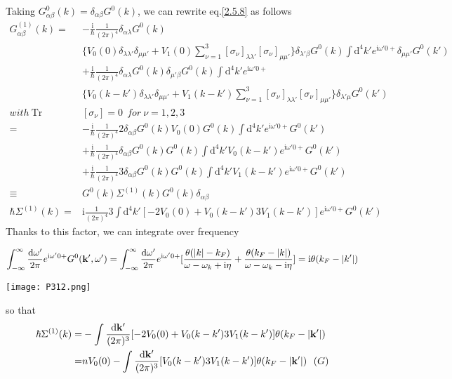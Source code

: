 Taking $G_{\alpha\beta}^0(k)=\delta_{\alpha\beta}G^0(k)$, we can rewrite eq.\eqref{2.5.8} as follows  
\begin{align}
G_{\alpha\beta}^{(1)}(k)=&-\frac{\mathrm{i}}{\hbar}\frac{1}{(2\pi)^4}\delta_{\alpha\lambda}G^{0}(k)
\nonumber \\
&\{V_0(0) \delta_{\lambda\lambda'}\delta_{\mu\mu'}+V_1(0)\sum_{\nu=1}^{3}[\sigma_{\nu}]_{\lambda\lambda'}[\sigma_{\nu}]_{\mu\mu'}\}\delta_{\lambda'\beta}G^0(k)\int \mathrm{d}^4k'e^{\mathrm{i}\omega'0+}\delta_{\mu\mu'}G^0(k')\nonumber \\
&+\frac{\mathrm{i}}{\hbar}\frac{1}{(2\pi)^4}\delta_{\alpha\lambda}G^0(k)\delta_{\mu'\beta}G^0(k)\int \mathrm{d}^4k'e^{\mathrm{i}\omega'0+}\nonumber\\
&\{V_0(k-k') \delta_{\lambda\lambda'}\delta_{\mu\mu'}+V_1(k-k')\sum_{\nu=1}^{3}[\sigma_{\nu}]_{\lambda\lambda'}[\sigma_{\nu}]_{\mu\mu'}\}\delta_{\lambda'\mu}G^0(k') \nonumber \\
with\ \mathrm{Tr}&[\sigma_{\nu}]=0\ \ for \ \nu=1,2,3 \nonumber \\
=&-\frac{\mathrm{i}}{\hbar}\frac{1}{(2\pi)^4}2\delta_{\alpha\beta}G^{0}(k)V_0(0)G^0(k)\int \mathrm{d}^4k'e^{\mathrm{i}\omega'0+}G^0(k')\nonumber \\
&+\frac{\mathrm{i}}{\hbar}\frac{1}{(2\pi)^4}\delta_{\alpha\beta}G^{0}(k)G^0(k)\int \mathrm{d}^4k'V_0(k-k')e^{\mathrm{i}\omega'0+}G^0(k')\nonumber \\
&+\frac{\mathrm{i}}{\hbar}\frac{1}{(2\pi)^4}3\delta_{\alpha\beta}G^{0}(k)G^0(k)\int \mathrm{d}^4k'V_1(k-k')e^{\mathrm{i}\omega'0+}G^0(k')\nonumber \\
\equiv& G^{0}(k)\Sigma^{(1)}(k)G^0(k)\delta_{\alpha\beta} \nonumber \\
\hbar \Sigma^{(1)}(k)=& \mathrm{i}\frac{1}{(2\pi)^4}3\int \mathrm{d}^4k'[-2V_0(0)+V_0(k-k')3V_1(k-k')]e^{\mathrm{i}\omega'0+}G^0(k') \nonumber
\end{align}
Thanks to this factor, we can integrate over frequency

\begin{align}
\int_{-\infty}^{\infty}\frac{\mathrm{d}\omega'}{2\pi}e^{\mathrm{i}\omega'0+}G^0({\bf k}',\omega')=\int_{-\infty}^{\infty}\frac{\mathrm{d}\omega'}{2\pi}e^{\mathrm{i}\omega'0+}[\frac{\theta(|k|-k_F)}{\omega-\omega_k+\mathrm{i}\eta}+\frac{\theta(k_F-|k|)}{\omega-\omega_k-\mathrm{i}\eta}]=\mathrm{i}\theta(k_F-|k'|) \nonumber
\end{align}
\begin{center}
\texttt{[image: P312.png]}
\end{center}
so that
\begin{align}\label{2.5.9}
\hbar \Sigma^{(1)}(k)=&-\int \frac{\mathrm{d}{\bf k}'}{(2\pi)^3}[-2V_0(0)+V_0(k-k')3V_1(k-k')]\theta(k_F-|{\bf k}'|) \nonumber \\
=& n V_0(0)-\int \frac{\mathrm{d}{\bf k}'}{(2\pi)^3}[V_0(k-k')3V_1(k-k')]\theta(k_F-|{\bf k}'|) \ \ (G) 
\end{align}

